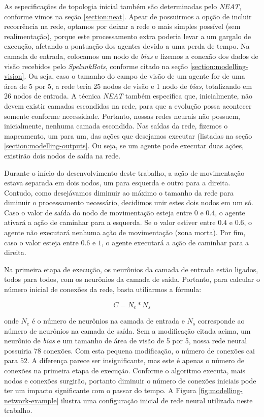 As especificações de topologia inicial também são determinadas pelo
\textit{NEAT}, conforme vimos na seção \ref{section:neat}. Apear de possuirmos a
opção de incluir recorrência na rede, optamos por deixar a rede o mais simples
possível (sem realimentação), porque este processamento extra poderia levar a um
gargalo de execução, afetando a pontuação dos agentes devido a uma perda de
tempo. Na camada de entrada, colocamos um nodo de \textit{bias} e  fizemos a
conexão dos dados de visão recebidos pelo \textit{SpelunkBots}, conforme citado
na seção \ref{section:modelling-vision}. Ou seja, caso o tamanho do campo de
visão de um agente for de uma área de 5 por 5, a rede teria 25 nodos de visão e
1 nodo de \textit{bias}, totalizando em 26 nodos de entrada. A técnica
\textit{NEAT} também especifica que, inicialmente, não devem existir camadas
escondidas na rede, para que a evolução possa acontecer somente conforme
necessidade. Portanto, nossas redes neurais não possuem, inicialmente, nenhuma
camada escondida. Nas saídas da rede, fizemos o mapeamento, um para um, das
ações que desejamos executar (listadas na seção \ref{section:modelling-outputs}.
Ou seja, se um agente pode executar duas ações, existirão dois nodos de saída na
rede.

Durante o início do desenvolvimento deste trabalho, a ação de movimentação
estava separada em dois nodos, um para esquerda e outro para a direita. Contudo,
como desejávamos diminuir ao máximo o tamanho da rede para diminuir o
processamento necessário, decidimos unir estes dois nodos em um só. Caso o valor
de saída do nodo de movimentação esteja entre $0$ e $0.4$, o agente ativará a
ação de caminhar para a esquerda. Se o valor estiver entre $0.4$ e $0.6$, o
agente não executará nenhuma ação de movimentação (zona morta). Por fim, caso o
valor esteja entre $0.6$ e $1$, o agente executará a ação de caminhar para a
direita.

Na primeira etapa de execução, os neurônios da camada de entrada estão ligados,
todos para todos, com os neurônios da camada de saída. Portanto, para calcular o
número inicial de conexões da rede, basta utiliarmos a fórmula:

\begin{equation}
	\label{eq:network-connections}
	C = N_e * N_s
\end{equation}

onde $N_e$ é o número de neurônios na camada de entrada e $N_s$ corresponde ao
número de neurônios na camada de saída. Sem a modificação citada acima, um
neurônio de \textit{bias} e um tamanho de área de visão de 5 por 5, nossa rede
neural possuiria $78$ conexões.  Com esta pequena modificação, o número de
conexões cai para $52$. A diferença parece ser insignificante, mas este é apenas
o número de conexões na primeira etapa de execução. Conforme o algoritmo
executa, mais nodos e conexões surgirão, portanto diminuir o número de conexões
iniciais pode ter um impacto significante com o passar do tempo. A Figura
\ref{fig:modelling-network-example} ilustra uma configuração inicial de rede
neural utilizada neste trabalho.

